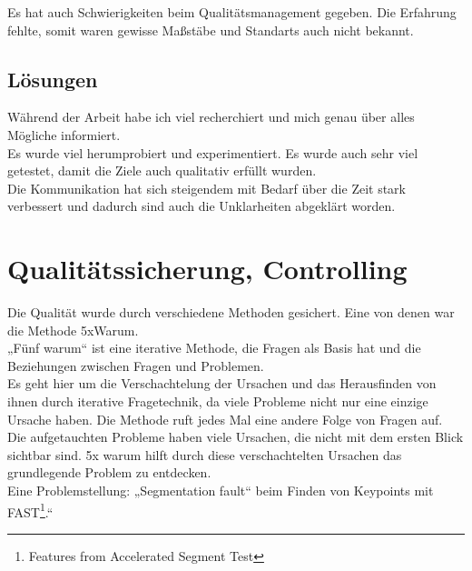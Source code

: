 Es hat auch Schwierigkeiten beim Qualitätsmanagement gegeben. Die
Erfahrung fehlte, somit waren gewisse Maßstäbe und Standarts auch nicht bekannt. 



\subsection{Lösungen}
Während der Arbeit habe ich viel recherchiert und mich genau über alles Mögliche
informiert. 
\\

Es wurde viel herumprobiert und experimentiert. Es wurde auch sehr viel
getestet, damit die Ziele auch qualitativ erfüllt wurden. 
\\
Die Kommunikation hat sich steigendem mit Bedarf über die Zeit stark verbessert und
dadurch sind auch die Unklarheiten abgeklärt worden. 


\section{Qualitätssicherung, Controlling}


Die Qualität wurde durch verschiedene Methoden gesichert. Eine von denen war die
Methode 5xWarum. 
\\
 
„Fünf warum“ ist eine iterative Methode, die Fragen als Basis hat und die
Beziehungen zwischen Fragen und Problemen. \\
Es geht hier um die Verschachtelung der Ursachen und das Herausfinden von ihnen durch iterative Fragetechnik, da viele Probleme nicht nur eine einzige Ursache haben. 
Die Methode ruft jedes Mal eine andere Folge von Fragen auf.\cite{fmea}
\\

Die aufgetauchten Probleme haben viele Ursachen, die nicht mit dem ersten Blick
sichtbar sind. 5x warum hilft durch diese verschachtelten Ursachen das
grundlegende Problem zu entdecken. \\

Eine Problemstellung: „Segmentation fault“ beim Finden von Keypoints mit
FAST\footnote{Features from Accelerated Segment Test}.“ 


